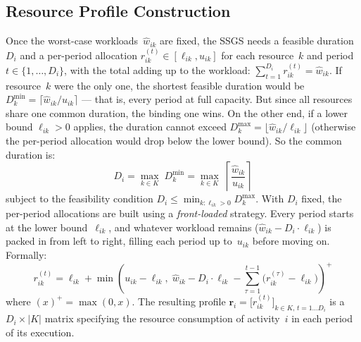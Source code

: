 \subsection{Resource Profile Construction}
\label{subsec:profile_construction}
Once the worst-case workloads~$\hat{w}_{ik}$ are fixed, the SSGS
needs a feasible duration~$D_i$ and a per-period allocation
$r_{ik}^{(t)} \in [\ell_{ik}, u_{ik}]$ for each resource~$k$ and
period~$t \in \{1, \ldots, D_i\}$, with the total adding up to the
workload: $\sum_{t=1}^{D_i} r_{ik}^{(t)} = \hat{w}_{ik}$.
If resource~$k$ were the only one, the shortest feasible duration
would be $D_k^{\min} = \lceil \hat{w}_{ik} / u_{ik} \rceil$ ---
that is, every period at full capacity. But since all resources
share one common duration, the binding one wins. On the other end,
if a lower bound $\ell_{ik} > 0$ applies, the duration cannot
exceed $D_k^{\max} = \lfloor \hat{w}_{ik} / \ell_{ik} \rfloor$
(otherwise the per-period allocation would drop below the lower
bound). So the common duration is:
\begin{equation}
    D_i = \max_{k \in K}\; D_k^{\min}
    = \max_{k \in K}\;
    \left\lceil \frac{\hat{w}_{ik}}{u_{ik}} \right\rceil
    \label{eq:duration}
\end{equation}
subject to the feasibility condition
$D_i \leq \min_{k : \ell_{ik} > 0} D_k^{\max}$.
With $D_i$ fixed, the per-period allocations are built using a
\textit{front-loaded} strategy. Every period starts at the lower
bound~$\ell_{ik}$, and whatever workload remains
($\hat{w}_{ik} - D_i \cdot \ell_{ik}$) is packed in from left to
right, filling each period up to~$u_{ik}$ before moving on.
Formally:
\begin{equation}
    r_{ik}^{(t)} = \ell_{ik}
    + \min\!\left(u_{ik} - \ell_{ik},\;
    \hat{w}_{ik} - D_i \cdot \ell_{ik}
    - \sum_{\tau=1}^{t-1}
    \bigl(r_{ik}^{(\tau)} - \ell_{ik}\bigr)\right)^{\!+}
    \label{eq:profile}
\end{equation}
where $(x)^+ = \max(0, x)$. The resulting profile
$\mathbf{r}_i = \bigl[r_{ik}^{(t)}\bigr]_{k \in K,\, t = 1
\ldots D_i}$ is a $D_i \times |K|$ matrix specifying the resource
consumption of activity~$i$ in each period of its execution.
